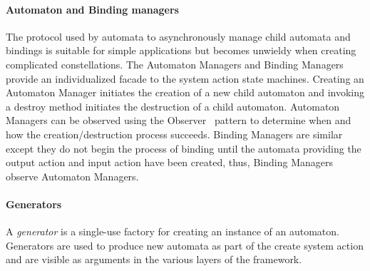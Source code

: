 \paragraph*{Automaton and Binding managers}
The protocol used by automata to asynchronously manage child automata and bindings is suitable for simple applications but becomes unwieldy when creating complicated constellations.
The Automaton Managers and Binding Managers provide an individualized facade to the system action state machines.
Creating an Automaton Manager initiates the creation of a new child automaton and invoking a destroy method initiates the destruction of a child automaton.
Automaton Managers can be observed using the Observer~\cite{gamma1995design} pattern to determine when and how the creation/destruction process succeeds.
Binding Managers are similar except they do not begin the process of binding until the automata providing the output action and input action have been created, thus, Binding Managers observe Automaton Managers.

\paragraph*{Generators}
A \emph{generator} is a single-use factory for creating an instance of an automaton.
Generators are used to produce new automata as part of the create system action and are visible as arguments in the various layers of the framework.
